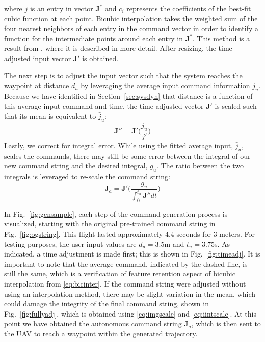 \documentclass[letterpaper, 10 pt, conference]{ieeeconf}  %
\newcommand\NB[1]{$\spadesuit$\footnote{NB: #1}}
\begin{document}
where $j$ is an entry in vector $\bm{J}^*$ and $c_i$ represents the coefficients of the best-fit cubic function at each point. %
Bicubic interpolation takes the weighted sum of the four nearest neighbors of each entry in the command vector in order to identify a function for the intermediate points around each entry in $\bm{J}^*$. This method is a result from \cite{bicfeatures}, where it is described in more detail. After resizing, the time adjusted input vector $\bm{J}'$ is obtained.

The next step is to adjust the input vector such that the system reaches the waypoint at distance $d_u$ by leveraging the average input command information $\bar{j}_u$. Because we have identified in Section~\ref{sec:sysdyn} that distance is a function of this average input command and time, the time-adjusted vector $\bm{J}'$ is scaled such that its mean is equivalent to $\bar{j}_u$:
\begin{equation} \label{eq:imgscale}
\bm{J}'' = \bm{J}'\bigg(\frac{\bar{j}_u}{\bar{j}'}\bigg)
\end{equation}
Lastly, we correct for integral error. While using the fitted average input, $\bar{j}_u$, scales the commands, there may still be some error between the integral of our new command string and the desired integral, $g_u$. The ratio between the two integrals is leveraged to re-scale the command string:
\begin{equation} \label{eq:iintscale}
\bm{J}_a = \bm{J}'\bigg(\frac{g_u}{\int_0^{t_u}\bm{J}''dt}\bigg)
\end{equation}


In Fig.~\ref{fig:gensample}, each step of the command generation process is visualized, starting with the original pre-trained command string in Fig.~\ref{fig:ogstring}. This flight lasted approximately $4.4$ seconds for $3$ meters. For testing purposes, the user input values are $d_u=3.5$m and $t_u=3.75$s. As indicated, a time adjustment is made first; this is shown in Fig.~\ref{fig:timeadj}. It is important to note that the average command, indicated by the dashed line, is still the same, which is a verification of feature retention aspect of bicubic interpolation from \eqref{eq:bicinter}. If the command string were adjusted without using an interpolation method, there may be slight variation in the mean, which could damage the integrity of the final command string, shown in Fig.~\ref{fig:fullyadj}, which is obtained using \eqref{eq:imgscale} and \eqref{eq:iintscale}. At this point we have obtained the autonomous command string $\bm{J}_a$, which is then sent to the UAV to reach a waypoint within the generated trajectory.
\end{document}
